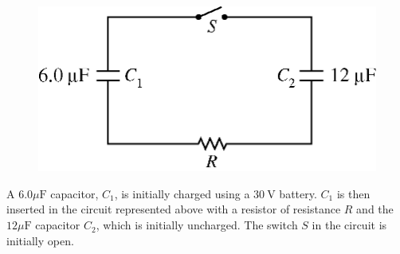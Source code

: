 %
\begin{figure}[H]
\centering
\includegraphics[scale=0.3]{images/img-018-044.png}
\end{figure}


\question
A $6.0 \mu \mathrm{F}$ capacitor, $C_{1}$, is initially charged using a $30 \mathrm{~V}$ battery. $C_{1}$ is then inserted in the circuit represented above with a resistor of resistance $R$ and the $12 \mu \mathrm{F}$ capacitor $C_{2}$, which is initially uncharged. The switch $S$ in the circuit is initially open. %

